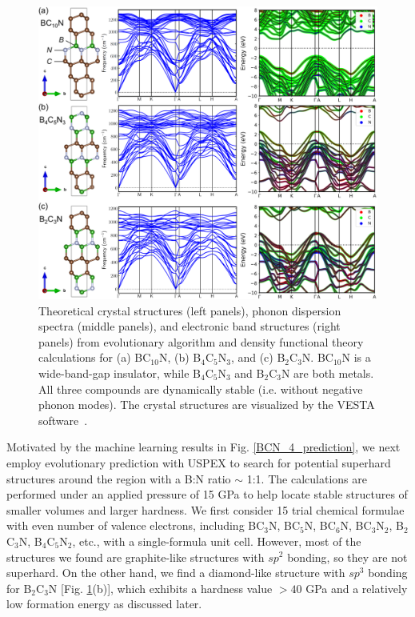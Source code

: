 	\begin{figure}[htbp]
        \centering
        \captionsetup{singlelinecheck = false, justification=justified}
        \includegraphics[width=1.0\textwidth]{BCN_5_dft.png}
        \caption[Crystal structures, band strcutures, and phonon dispersion of BC$_{10}$N, B$_4$C$_5$N$_3$, and B$_2$C$_3$N.]{Theoretical crystal structures (left panels), phonon dispersion spectra (middle panels), and electronic band structures (right panels) from evolutionary algorithm and density functional theory calculations for (a) BC$_{10}$N, (b) B$_4$C$_5$N$_3$, and (c) B$_2$C$_3$N. BC$_{10}$N is a wide-band-gap insulator, while B$_4$C$_5$N$_3$ and B$_2$C$_3$N are both metals. All three compounds are dynamically stable (i.e. without negative phonon modes). The crystal structures are visualized by the VESTA software~\cite{momma2011vesta}.}
        \label{BCN_5_dft}
    \end{figure}

    
	Motivated by the machine learning results in Fig. \ref{BCN_4_prediction}, we next employ evolutionary prediction with USPEX to search for potential superhard structures around the region with a B:N ratio $\sim$ 1:1. The calculations are performed under an applied pressure of 15 GPa to help locate stable structures of smaller volumes and larger hardness.
	We first consider 15 trial chemical formulae with even number of valence electrons, including BC$_3$N, BC$_5$N, BC$_6$N, BC$_3$N$_2$, B$_2$C$_3$N, B$_4$C$_5$N$_2$, etc., with a single-formula unit cell.
	However, most of the structures we found are graphite-like structures with $sp^2$ bonding, so they are not superhard.
	On the other hand, we find a diamond-like structure with $sp^3$ bonding for B$_2$C$_3$N [Fig. \ref{BCN_5_dft}(b)], which exhibits a hardness value $> 40$ GPa and a relatively low formation energy as discussed later.
	
